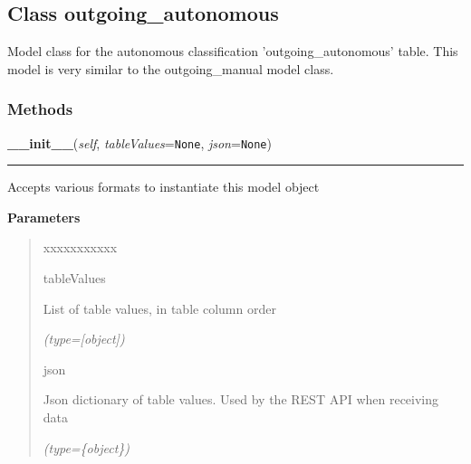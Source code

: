 \subsection{Class outgoing\_autonomous}

    \label{src:dao:model:outgoing_autonomous:outgoing_autonomous}
Model class for the autonomous classification 'outgoing\_autonomous' table.
This model is very similar to the outgoing\_manual model class.



  \subsubsection{Methods}

    \label{src:dao:model:outgoing_autonomous:outgoing_autonomous:__init__}

    \vspace{0.5ex}

\hspace{.8\funcindent}\begin{boxedminipage}{\funcwidth}

    \raggedright \textbf{\_\_init\_\_}(\textit{self}, \textit{tableValues}={\tt None}, \textit{json}={\tt None})

    \vspace{-1.5ex}

    \rule{\textwidth}{0.5\fboxrule}
\setlength{\parskip}{2ex}
    Accepts various formats to instantiate this model object

\setlength{\parskip}{1ex}
      \textbf{Parameters}
      \vspace{-1ex}

      \begin{quote}
        \begin{Ventry}{xxxxxxxxxxx}

          \item[tableValues]

          List of table values, in table column order

            {\it (type=[object])}

          \item[json]

          Json dictionary of table values. Used by the REST API when 
          receiving data

            {\it (type=\{object\})}

        \end{Ventry}

      \end{quote}

    \end{boxedminipage}

